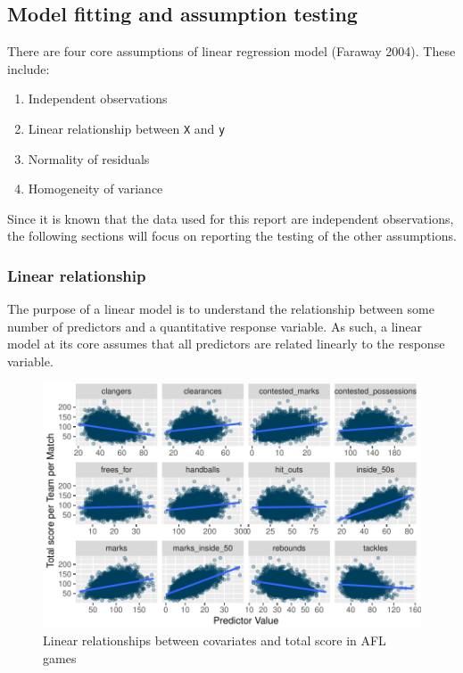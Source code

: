 \documentclass{article}
\begin{document}
\hypertarget{model-fitting-and-assumption-testing}{%
\subsection{Model fitting and assumption testing}\label{model-fitting-and-assumption-testing}}

There are four core assumptions of linear regression model (Faraway 2004). These include:

\begin{enumerate}
\def\labelenumi{\arabic{enumi}.}
\tightlist
\item
  Independent observations
\item
  Linear relationship between \texttt{X} and \texttt{y}
\item
  Normality of residuals
\item
  Homogeneity of variance
\end{enumerate}

Since it is known that the data used for this report are independent observations, the following sections will focus on reporting the testing of the other assumptions.

\hypertarget{linear-relationship}{%
\subsubsection{Linear relationship}\label{linear-relationship}}

The purpose of a linear model is to understand the relationship between some number of predictors and a quantitative response variable. As such, a linear model at its core assumes that all predictors are related linearly to the response variable.

\begin{figure}
\centering
\includegraphics{OLET5608_TrentHenderson_files/figure-latex/unnamed-chunk-4-1.pdf}
\caption{\label{fig:unnamed-chunk-4}Linear relationships between covariates and total score in AFL games}
\end{figure}
\end{document}
